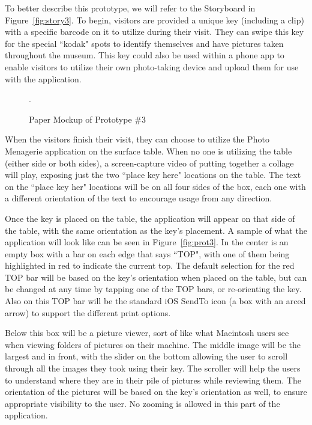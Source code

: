 \documentclass{tei2013}
\begin{document}
To better describe this prototype, we will refer to the Storyboard in Figure~\ref{fig:story3}.  To begin, visitors are provided a unique key (including a clip) with a specific barcode on it to utilize during their visit.  They can swipe this key for the special ``kodak" spots to identify themselves and have pictures taken throughout the museum.  This key could also be used within a phone app to enable visitors to utilize their own photo-taking device and upload them for use with the application.
\begin{figure}[ht]
\centering
{}%
\caption{Paper Mockup of Prototype \#3}
\label{fig:prot3-paper}.
\end{figure}
 
When the visitors finish their visit, they can choose to utilize the Photo Menagerie application on the surface table.  When no one is utilizing the table (either side or both sides), a screen-capture video of putting together a collage will play, exposing just the two ``place key here" locations on the table.  The text on the ``place key her" locations will be on all four sides of the box, each one with a different orientation of the text to encourage usage from any direction.

Once the key is placed on the table, the application will appear on that side of the table, with the same orientation as the key's placement.  A sample of what the application will look like can be seen in Figure~\ref{fig:prot3}.  In the center is an empty box with a bar on each edge that says ``TOP", with one of them being highlighted in red to indicate the current top.  The default selection for the red TOP bar will be based on the key's orientation when placed on the table, but can be changed at any time by tapping one of the TOP bars, or re-orienting the key.  Also on this TOP bar will be the standard iOS SendTo icon (a box with an arced arrow) to support the different print options.

Below this box will be a picture viewer, sort of like what Macintosh users see when viewing folders of pictures on their machine.  The middle image will be the largest and in front, with the slider on the bottom allowing the user to scroll through all the images they took using their key.  The scroller will help the users to understand where they are in their pile of pictures while reviewing them.  The orientation of the pictures will be based on the key's orientation as well, to ensure appropriate visibility to the user.  No zooming is allowed in this part of the application.
\end{document}
